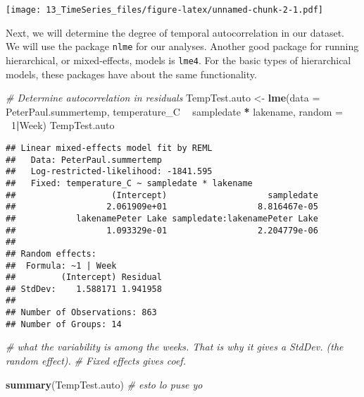 \documentclass[]{article}
\newenvironment{Shaded}{\begin{snugshade}}{\end{snugshade}}
\newcommand{\KeywordTok}[1]{\textcolor[rgb]{0.13,0.29,0.53}{\textbf{#1}}}
\newcommand{\DataTypeTok}[1]{\textcolor[rgb]{0.13,0.29,0.53}{#1}}
\newcommand{\DecValTok}[1]{\textcolor[rgb]{0.00,0.00,0.81}{#1}}
\newcommand{\StringTok}[1]{\textcolor[rgb]{0.31,0.60,0.02}{#1}}
\newcommand{\CommentTok}[1]{\textcolor[rgb]{0.56,0.35,0.01}{\textit{#1}}}
\newcommand{\OperatorTok}[1]{\textcolor[rgb]{0.81,0.36,0.00}{\textbf{#1}}}
\newcommand{\NormalTok}[1]{#1}
\begin{document}
\texttt{[image: 13\_TimeSeries\_files/figure-latex/unnamed-chunk-2-1.pdf]}

Next, we will determine the degree of temporal autocorrelation in our
dataset. We will use the package \texttt{nlme} for our analyses. Another
good package for running hierarchical, or mixed-effects, models is
\texttt{lme4}. For the basic types of hierarchical models, these
packages have about the same functionality.

\begin{Shaded}
\begin{Highlighting}[]
\CommentTok{# Determine autocorrelation in residuals}
\NormalTok{TempTest.auto <-}\StringTok{ }\KeywordTok{lme}\NormalTok{(}\DataTypeTok{data =}\NormalTok{ PeterPaul.summertemp,}
\NormalTok{                     temperature_C }\OperatorTok{~}\StringTok{ }\NormalTok{sampledate }\OperatorTok{*}\StringTok{ }\NormalTok{lakename, }
                     \DataTypeTok{random =} \OperatorTok{~}\DecValTok{1}\OperatorTok{|}\NormalTok{Week)}
\NormalTok{TempTest.auto}
\end{Highlighting}
\end{Shaded}

\begin{verbatim}
## Linear mixed-effects model fit by REML
##   Data: PeterPaul.summertemp 
##   Log-restricted-likelihood: -1841.595
##   Fixed: temperature_C ~ sampledate * lakename 
##                   (Intercept)                    sampledate 
##                  2.061909e+01                  8.816467e-05 
##            lakenamePeter Lake sampledate:lakenamePeter Lake 
##                  1.093329e-01                  2.204779e-06 
## 
## Random effects:
##  Formula: ~1 | Week
##         (Intercept) Residual
## StdDev:    1.588171 1.941958
## 
## Number of Observations: 863
## Number of Groups: 14
\end{verbatim}

\begin{Shaded}
\begin{Highlighting}[]
\CommentTok{# what the variability is among the weeks. That is why it gives a StdDev. (the random effect).}
\CommentTok{# Fixed effects gives coef.}

\KeywordTok{summary}\NormalTok{(TempTest.auto) }\CommentTok{# esto lo puse yo}
\end{Highlighting}
\end{Shaded}
\end{document}
